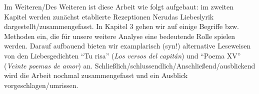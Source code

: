Im Weiteren/Des Weiteren ist diese Arbeit wie folgt aufgebaut: im zweiten Kapitel werden zunächst etablierte Rezeptionen Nerudas Liebeslyrik dargestellt/zusammengefasst.
In Kapitel 3 gehen wir auf einige Begriffe bzw. Methoden ein, die für unsere weitere Analyse eine bedeutende Rolle spielen werden.
Darauf aufbauend bieten wir examplarisch (syn!) alternative Leseweisen von den Liebesgedichten ``Tu risa'' (\textit{Los versos del capitán}) und ``Poema XV'' (\textit{Veinte poemas de amor}) an.
Schließlich/schlussendlich/Anschließend/ausblickend wird die Arbeit nochmal zusammengefasst und ein Ausblick vorgeschlagen/umrissen.

\begin{comment}
1. Intro
  * Ziel von Feministischen Lektüren: zugrunde liegende Machtstrukturen in Werken und deren Rezeption aufzudecken
    ** androzentrische Perspektive der Literatur:
       *** Männer in Mittelpunkt (als Figuren)
       *** von Männern gemacht
       *** an Männer gerichtet
  * Wie erreicht? Durch eine Pluralität der Lektüren und Close Reading
ohne das ouevre Nerudas nicht als ganzes in Frage stellen
exemplarische Lektüren: Poetisierung bestimmter Heteronormativen Perspektiven
gehört historisiert; nicht als zeitlos darzustellen

* durch Sprache (und Literatur dann) bestimmte identitäre Zuschreibung geprägt: Sprache formt unser Gehirn, Gedanken, Weltanschauung, Denkweise, Kathegorien --> im Kopf behalten wenn man mit "Lektüren" umgeht
\end{comment}

